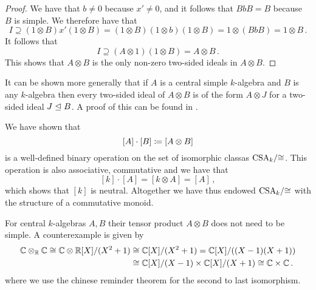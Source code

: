 \begin{proof}
  We have that $b \neq 0$ because $x' \neq 0$, and it follows that $BbB = B$ because $B$ is simple.
  We therefore have that
  \[
              I
    \supseteq (1 \otimes B) x' (1 \otimes B)
    =         (1 \otimes B) (1 \otimes b) (1 \otimes B)
    =         1 \otimes (BbB)
    =         1 \otimes B \,.
  \]
  It follows that
  \[
              I
    \supseteq (A \otimes 1) (1 \otimes B)
    =         A \otimes B \,.
  \]
  This shows that $A \otimes B$ is the only non-zero two-sided ideals in $A \otimes B$.
\end{proof}


\begin{remark}
  It can be shown more generally that if $A$ is a central simple $k$-algebra and $B$ is any $k$-algebra then every two-sided ideal of $A \otimes B$ is of the form $A \otimes J$ for a two-sided ideal $J \trianglelefteq B$.
  A proof of this can be found in \cite[Lemma~4.1]{Clark2012NonCA}.
\end{remark}


\begin{fluff}
  We have shown that
  \[
              [A] \cdot [B]
    \coloneqq  [A \otimes B]
  \]
  is a well-defined binary operation on the set of isomorphic classas $\operatorname{CSA}_k\!/{\cong}$.
  This operation is also associative, commutative and we have that
  \[
      [k] \cdot [A]
    = [k \otimes A]
    = [A] \,,
  \]
  which shows that $[k]$ is neutral.
  Altogether we have thus endowed $\operatorname{CSA}_k\!/{\cong}$ with the structure of a commutative monoid.
\end{fluff}


\begin{warning}
  For central $k$-algebras $A, B$ their tensor product $A \otimes B$ does not need to be simple.
  A counterexample is given by
  \begin{align*}
            \mathbb{C} \otimes_{\mathbb{R}} \mathbb{C}
     \cong  \mathbb{C} \otimes \mathbb{R}[X]/(X^2 + 1)
    &\cong  \mathbb{C}[X]/(X^2 + 1)
     =      \mathbb{C}[X]/((X-1)(X+1))
    \\
    &\cong  \mathbb{C}[X]/(X-1) \times \mathbb{C}[X]/(X+1)
     \cong  \mathbb{C} \times \mathbb{C} \,.
  \end{align*}
  where we use the chinese reminder theorem for the second to last isomorphism.
\end{warning}




